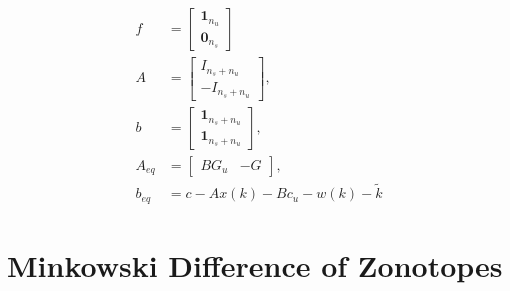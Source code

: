 \documentclass[10pt,a4paper]{article}
\renewcommand{\^}[1]{^{(#1)}}
\begin{document}
\begin{equation*}
 \begin{split}
  f &= \begin{bmatrix} \mathbf{1}_{n_u} \\ \mathbf{0}_{n_s}
  \end{bmatrix} \\
  A &= \begin{bmatrix} I_{n_s + n_u} \\ -I_{n_s + n_u}
  \end{bmatrix}, \\
  b &= \begin{bmatrix} \mathbf{1}_{n_s + n_u} \\ \mathbf{1}_{n_s + n_u} \end{bmatrix}, \\
  A_{eq} &= \begin{bmatrix} B G_u & -G
  \end{bmatrix}, \\
  b_{eq} &= c - Ax(k) - B c_u - w(k) - \tilde{k}
 \end{split}
\end{equation*}



\section{Minkowski Difference of Zonotopes}






\end{document}
